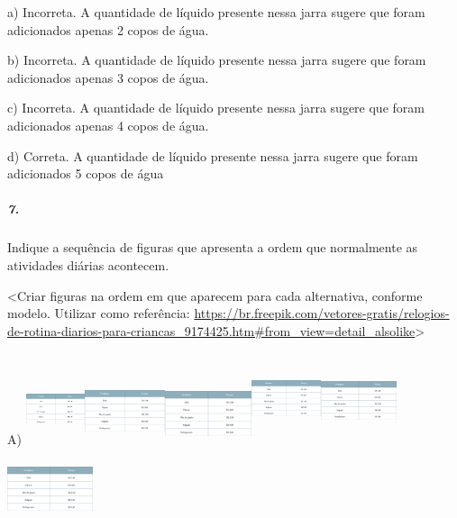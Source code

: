 a) Incorreta. A quantidade de líquido presente nessa jarra sugere que
foram adicionados apenas 2 copos de água.

b) Incorreta. A quantidade de líquido presente nessa jarra sugere que
foram adicionados apenas 3 copos de água.

c) Incorreta. A quantidade de líquido presente nessa jarra sugere que
foram adicionados apenas 4 copos de água.

d) Correta. A quantidade de líquido presente nessa jarra sugere que
foram adicionados 5 copos de água

\subparagraph{7. }\label{section-136}

Indique a sequência de figuras que apresenta a ordem que normalmente as
atividades diárias acontecem.

\textless{}Criar figuras na ordem em que aparecem para cada alternativa,
conforme modelo. Utilizar como referência:
\url{https://br.freepik.com/vetores-gratis/relogios-de-rotina-diarios-para-criancas_9174425.htm\#from_view=detail_alsolike}\textgreater{}

A)
\includegraphics[width=0.68193in,height=0.81736in]{media/image148.png}\includegraphics[width=0.92914in,height=0.77678in]{media/image148.png}\includegraphics[width=1.00005in,height=0.71336in]{media/image148.png}\includegraphics[width=0.80414in,height=1.05999in]{media/image148.png}\includegraphics[width=0.86664in,height=1.01803in]{media/image148.png}\includegraphics[width=0.99167in,height=0.93413in]{media/image148.png}

